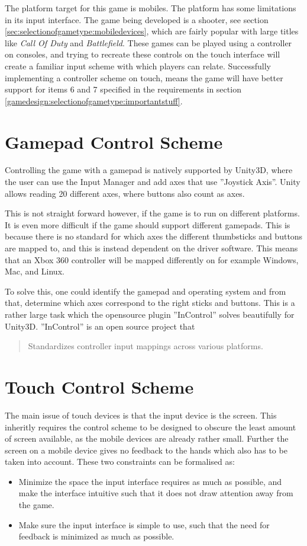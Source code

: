 The platform target for this game is mobiles.
The platform has some limitations in its input interface.
The game being developed is a shooter, see section \ref{sec:selectionofgametype:mobiledevices}, which are fairly popular with large titles like \emph{Call Of Duty} and \emph{Battlefield}.
These games can be played using a controller on consoles, and trying to recreate these controls on the touch interface will create a familiar input scheme with which players can relate.
Successfully implementing a controller scheme on touch, means the game will have better support for items 6 and 7 specified in the requirements in section \ref{gamedesign:selectionofgametype:importantstuff}.

\section{Gamepad Control Scheme}
Controlling the game with a gamepad is natively supported by Unity3D, where the user can use the Input Manager \cite{unity_manual_inputmanager} and add axes that use ''Joystick Axis''. Unity allows reading 20 different axes, where buttons also count as axes.

This is not straight forward however, if the game is to run on different platforms. It is even more difficult if the game should support different gamepads. This is because there is no standard for which axes the different thumbsticks and buttons are mapped to, and this is instead dependent on the driver software. This means that an Xbox 360 controller will be mapped differently on for example Windows, Mac, and Linux.
\cite{unity_wiki_xbox360controller}

To solve this, one could identify the gamepad and operating system and from that, determine which axes correspond to the right sticks and buttons. This is a rather large task which the opensource plugin ''InControl'' solves beautifully for Unity3D\cite{incontrol_github}. ''InControl'' is an open source project that \begin{quote}Standardizes controller input mappings across various platforms.\cite{incontrol_website}\end{quote}

\section{Touch Control Scheme}
The main issue of touch devices is that the input device is the screen.
This inheritly requires the control scheme to be designed to obscure the least amount of screen available, as the mobile devices are already rather small.
Further the screen on a mobile device gives no feedback to the hands which also has to be taken into account.
These two constraints can be formalised as:
\begin{itemize}
\item Minimize the space the input interface requires as much as possible, and make the interface intuitive such that it does not draw attention away from the game.
\item Make sure the input interface is simple to use, such that the need for feedback is minimized as much as possible.
\end{itemize}

